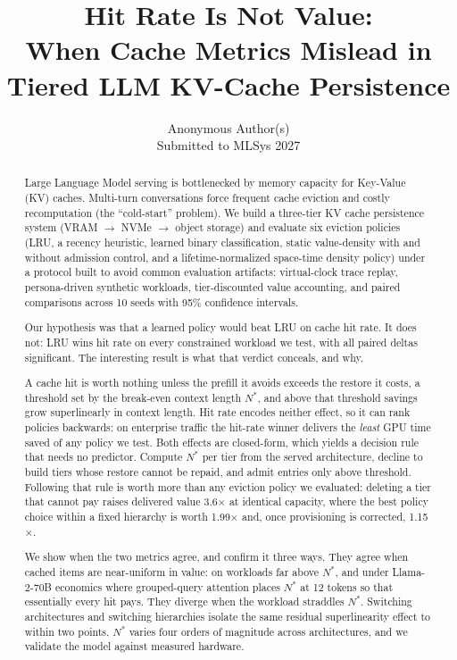 \documentclass[letterpaper,twocolumn,10pt]{article}
\title{\Large \bf Hit Rate Is Not Value:\\
When Cache Metrics Mislead in\\
Tiered LLM KV-Cache Persistence}
\author{
  {\rm Anonymous Author(s)} \\
  {\rm Submitted to MLSys 2027}
}
\date{}
\begin{document}
\maketitle

\begin{abstract}
Large Language Model serving is bottlenecked by memory capacity for Key-Value (KV) caches. Multi-turn conversations force frequent cache eviction and costly recomputation (the ``cold-start'' problem). We build a three-tier KV cache persistence system (VRAM $\to$ NVMe $\to$ object storage) and evaluate six eviction policies (LRU, a recency heuristic, learned binary classification, static value-density with and without admission control, and a lifetime-normalized space-time density policy) under a protocol built to avoid common evaluation artifacts: virtual-clock trace replay, persona-driven synthetic workloads, tier-discounted value accounting, and paired comparisons across 10 seeds with 95\% confidence intervals.

Our hypothesis was that a learned policy would beat LRU on cache hit rate. It does not: LRU wins hit rate on every constrained workload we test, with all paired deltas significant. The interesting result is what that verdict conceals, and why.

A cache hit is worth nothing unless the prefill it avoids exceeds the restore it costs, a threshold set by the break-even context length $N^{*}$, and above that threshold savings grow superlinearly in context length. Hit rate encodes neither effect, so it can rank policies backwards: on enterprise traffic the hit-rate winner delivers the \emph{least} GPU time saved of any policy we test. Both effects are closed-form, which yields a decision rule that needs no predictor. Compute $N^{*}$ per tier from the served architecture, decline to build tiers whose restore cannot be repaid, and admit entries only above threshold. Following that rule is worth more than any eviction policy we evaluated: deleting a tier that cannot pay raises delivered value 3.6$\times$ at identical capacity, where the best policy choice within a fixed hierarchy is worth 1.99$\times$ and, once provisioning is corrected, 1.15$\times$.

We show when the two metrics agree, and confirm it three ways. They agree when cached items are near-uniform in value: on workloads far above $N^{*}$, and under Llama-2-70B economics where grouped-query attention places $N^{*}$ at 12 tokens so that essentially every hit pays. They diverge when the workload straddles $N^{*}$. Switching architectures and switching hierarchies isolate the same residual superlinearity effect to within two points. $N^{*}$ varies four orders of magnitude across architectures, and we validate the model against measured hardware.


\end{abstract}
\end{document}
